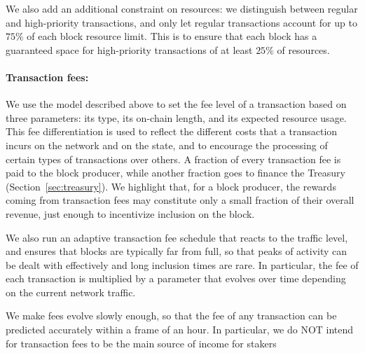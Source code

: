 We also add an additional constraint on resources: we distinguish between regular and high-priority transactions, and only let regular transactions account for up to $75\%$ of each block resource limit. This is to ensure that each block has a guaranteed space for high-priority transactions of at least $25\%$ of resources.

\paragraph{Transaction fees:} We use the model described above to set the fee level of a transaction based on three parameters: its type, its on-chain length, and its expected resource usage. This fee differentiation is used to reflect the different costs that a transaction incurs on the network and on the state, and to encourage the processing of certain types of transactions over others. A fraction of every transaction fee is paid to the block producer, while another fraction goes to finance the Treasury (Section~\ref{sec:treasury}). We highlight that, for a block producer, the rewards coming from transaction fees may constitute only a small fraction of their overall revenue, just enough to incentivize inclusion on the block.

We also run an adaptive transaction fee schedule that reacts to the traffic level, and ensures that blocks are typically far from full, so that peaks of activity can be dealt with effectively and long inclusion times are rare. In particular, the fee of each transaction is multiplied by a parameter that evolves over time depending on the current network traffic. 

 

We make fees evolve slowly enough, so that the fee of any transaction can be predicted accurately within a frame of an hour. In particular, we do NOT intend for transaction fees to be the main source of income for stakers



